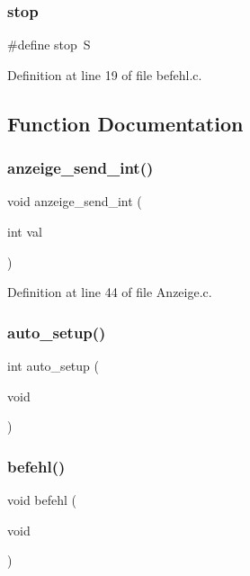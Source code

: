 \subsubsection{stop}
{\footnotesize\ttfamily \#define stop~\textquotesingle{}S\textquotesingle{}}



Definition at line 19 of file befehl.\+c.



\subsection{Function Documentation}
\mbox{\label{befehl_8c_abd5892eb2cdbb10eb3cdb450a3753adc}} 
\subsubsection{anzeige\+\_\+send\+\_\+int()}
{\footnotesize\ttfamily void anzeige\+\_\+send\+\_\+int (\begin{DoxyParamCaption}\item[{int}]{val }\end{DoxyParamCaption})}



Definition at line 44 of file Anzeige.\+c.

\mbox{\label{befehl_8c_a74908ae0608550a6106b2d9348f1cb86}} 
\subsubsection{auto\+\_\+setup()}
{\footnotesize\ttfamily int auto\+\_\+setup (\begin{DoxyParamCaption}\item[{void}]{ }\end{DoxyParamCaption})}

\mbox{\label{befehl_8c_abea6cead6dcc33be4b61c0a03864d0de}} 
\subsubsection{befehl()}
{\footnotesize\ttfamily void befehl (\begin{DoxyParamCaption}\item[{void}]{ }\end{DoxyParamCaption})}

